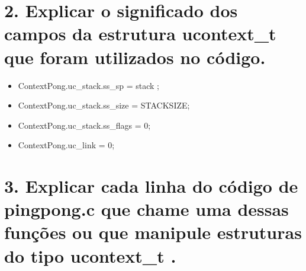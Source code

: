 \documentclass[12pt]{article}
\begin{document}
\section*{2. Explicar o significado dos campos da estrutura ucontext\_t que foram utilizados no código.}
\begin{itemize}
	\item ContextPong.uc\_stack.ss\_sp = stack ;
	\item ContextPong.uc\_stack.ss\_size = STACKSIZE;
	\item ContextPong.uc\_stack.ss\_flags = 0;
	\item ContextPong.uc\_link = 0;
\end{itemize}


\section*{3. Explicar cada linha do código de pingpong.c que chame uma dessas funções ou que manipule estruturas do tipo ucontext\_t .}
\end{document}
